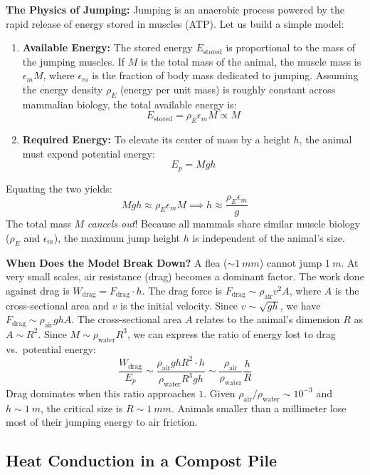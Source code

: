 \textbf{The Physics of Jumping:}
Jumping is an anaerobic process powered by the rapid release of energy stored in muscles (ATP). Let us build a simple model:
\begin{enumerate}
    \item \textbf{Available Energy:} The stored energy $E_\text{stored}$ is proportional to the mass of the jumping muscles. If $M$ is the total mass of the animal, the muscle mass is $\epsilon_m M$, where $\epsilon_m$ is the fraction of body mass dedicated to jumping. Assuming the energy density $\rho_E$ (energy per unit mass) is roughly constant across mammalian biology, the total available energy is:
    \[
        E_\text{stored} = \rho_E \epsilon_m M \propto M
    \]
    \item \textbf{Required Energy:} To elevate its center of mass by a height $h$, the animal must expend potential energy:
    \[
        E_p = M g h
    \]
\end{enumerate}
Equating the two yields:
\[
    M g h \approx \rho_E \epsilon_m M \implies h \approx \frac{\rho_E \epsilon_m}{g}
\]
The total mass $M$ \emph{cancels out}! Because all mammals share similar muscle biology ($\rho_E$ and $\epsilon_m$), the maximum jump height $h$ is independent of the animal's size.

\textbf{When Does the Model Break Down?}
A flea ($\sim \SI{1}{mm}$) cannot jump $\SI{1}{m}$. At very small scales, air resistance (drag) becomes a dominant factor. The work done against drag is $W_\text{drag} = F_\text{drag} \cdot h$.
The drag force is $F_\text{drag} \sim \rho_\text{air} v^2 A$, where $A$ is the cross-sectional area and $v$ is the initial velocity. Since $v \sim \sqrt{gh}$, we have $F_\text{drag} \sim \rho_\text{air} g h A$.
The cross-sectional area $A$ relates to the animal's dimension $R$ as $A \sim R^2$. Since $M \sim \rho_\text{water} R^3$, we can express the ratio of energy lost to drag vs.\ potential energy:
\[
    \frac{W_\text{drag}}{E_p} \sim \frac{\rho_\text{air} g h R^2 \cdot h}{\rho_\text{water} R^3 g h} \sim \frac{\rho_\text{air}}{\rho_\text{water}} \frac{h}{R}
\]
Drag dominates when this ratio approaches $1$. Given $\rho_\text{air} / \rho_\text{water} \sim 10^{-3}$ and $h \sim \SI{1}{m}$, the critical size is $R \sim \SI{1}{mm}$. Animals smaller than a millimeter lose most of their jumping energy to air friction.

\subsection{Heat Conduction in a Compost Pile}

